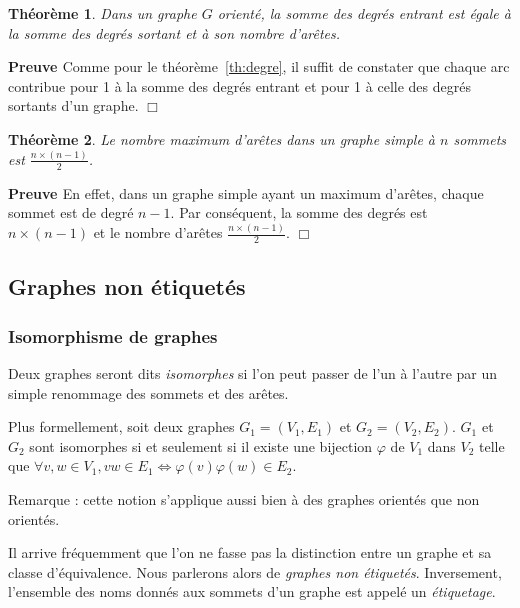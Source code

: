 \documentclass[11pt,a4paper]{report}
\newtheorem{theorem}{Théorème}
\newcommand{\bpr}{{\bf {Preuve }}}
\newcommand{\epr}{\hfill$\Box$\\}
\begin{document}
\begin{theorem}
Dans un graphe $G$ orient\'e, la somme des degr\'es entrant est \'egale
\`a la somme des degr\'es sortant et \`a son nombre d'arêtes.
\end{theorem}
\bpr
Comme pour le théorème~\ref{th:degre}, il suffit de constater que chaque arc contribue pour 1 à la somme des degrés entrant et pour 1 à celle des degrés sortants d'un graphe. 
\epr

\begin{theorem}
Le nombre maximum d'arêtes dans un graphe simple à $n$ sommets est $\frac{n \times (n  - 1)}{2}$.
\end{theorem}
\bpr
En effet, dans un graphe simple ayant un maximum d'arêtes, chaque sommet est de degré $n-1$. Par conséquent, la somme des degrés est $n \times (n-1)$ et le nombre d'arêtes $\frac{n \times (n  - 1)}{2}$.
\epr


\subsection{Graphes non étiquetés}

\subsubsection{Isomorphisme de graphes}

Deux graphes seront dits {\em isomorphes} si l'on peut passer de l'un \`a
l'autre par un simple renommage des sommets et des ar\^etes.

Plus formellement, soit deux graphes $G_1 = (V_1, E_1)$ et $G_2 = (V_2, E_2)$. $G_1$ et $G_2$ sont isomorphes si et seulement si il existe une bijection $\varphi$ de $V_1$ dans $V_2$ telle que $\forall v, w \in V_1, vw \in E_1 \Leftrightarrow  \varphi(v)\varphi(w) \in E_2$. 

Remarque :  cette notion s'applique aussi bien à des graphes orientés que non orientés.
 
Il arrive 
fr\'equemment que l'on ne fasse pas la distinction entre un graphe et
sa classe d'\'equivalence. Nous parlerons alors de {\em graphes non \'etiquet\'es}.
Inversement, l'ensemble des noms donn\'es aux sommets d'un graphe est appel\'e
un {\em \'etiquetage}.
\end{document}
